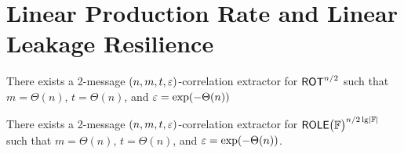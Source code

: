\section{Linear Production Rate and Linear Leakage Resilience}\label{sec:bgmn}

\begin{theorem}\label{thm:bgmn-rot}
	There exists a 2-message $(n,m,t,\varepsilon)$-correlation extractor for $\ROT[n/2]$ such that $m = \Theta(n)$, $t = \Theta(n)$, and $\varepsilon = \exp(-\Theta(n))$
\end{theorem}

\begin{theorem}
	\label{thm:bgmn-role} 
	There exists a 2-message $(n,m,t,\varepsilon)$-correlation extractor for $\ROLE[\bbF]^{n/2\lg\abs\bbF}$  such that $m=\Theta(n)$, $t=\Theta(n)$, and $\varepsilon=\exp(-\Theta(n))$. %
\end{theorem}